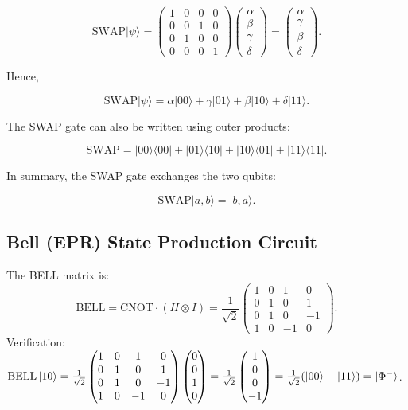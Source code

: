 \documentclass[10pt,a4paper]{article}
\begin{document}
\[
\mathrm{SWAP}|\psi\rangle
=
\begin{pmatrix}
1 & 0 & 0 & 0 \\
0 & 0 & 1 & 0 \\
0 & 1 & 0 & 0 \\
0 & 0 & 0 & 1
\end{pmatrix}
\begin{pmatrix}
\alpha \\
\beta \\
\gamma \\
\delta
\end{pmatrix}
=
\begin{pmatrix}
\alpha \\
\gamma \\
\beta \\
\delta
\end{pmatrix}.
\]

Hence,

\[
\mathrm{SWAP}|\psi\rangle
=
\alpha |00\rangle
+
\gamma |01\rangle
+
\beta |10\rangle
+
\delta |11\rangle.
\]

The SWAP gate can also be written using outer products:

\[
\mathrm{SWAP}
=
|00\rangle\langle 00|
+
|01\rangle\langle 10|
+
|10\rangle\langle 01|
+
|11\rangle\langle 11|.
\]

In summary, the SWAP gate exchanges the two qubits:

\[
\mathrm{SWAP}|a,b\rangle = |b,a\rangle .
\]




\subsection{Bell (EPR) State Production Circuit}

The BELL matrix is:
\[
\mathrm{BELL}=\mathrm{CNOT}\cdot(H\otimes I)=\frac{1}{\sqrt{2}}\begin{pmatrix}1&0&1&0\\0&1&0&1\\0&1&0&-1\\1&0&-1&0\end{pmatrix}.
\]
Verification: $\mathrm{BELL}\ket{10}=\frac{1}{\sqrt{2}}\begin{pmatrix}1&0&1&0\\0&1&0&1\\0&1&0&-1\\1&0&-1&0\end{pmatrix}\begin{pmatrix}0\\0\\1\\0\end{pmatrix}=\frac{1}{\sqrt{2}}\begin{pmatrix}1\\0\\0\\-1\end{pmatrix}=\frac{1}{\sqrt{2}}(\ket{00}-\ket{11})=\ket{\Phi^-}$.
\end{document}
